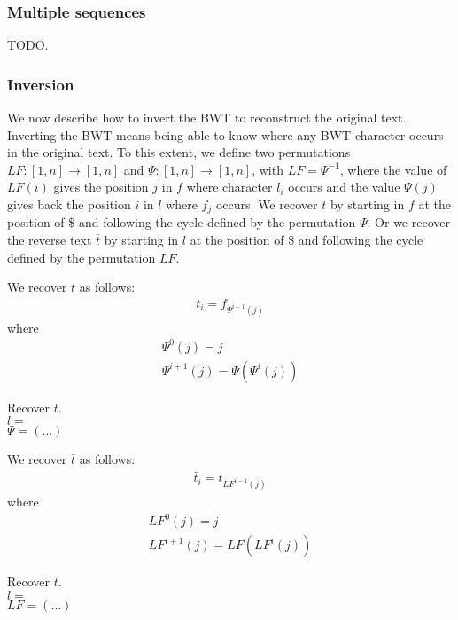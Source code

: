 \subsubsection{Multiple sequences}

TODO.

\subsubsection{Inversion}

We now describe how to invert the BWT to reconstruct the original text.
Inverting the BWT means being able to know where any BWT character occurs in the original text.
To this extent, we define two permutations $LF : [1,n] \rightarrow [1,n]$ and $\Psi : [1,n] \rightarrow [1,n]$, with $LF = \Psi^{-1}$, where the value of $LF(i)$ gives the position $j$ in $f$ where character $l_i$ occurs and the value $\Psi(j)$ gives back the position $i$ in $l$ where $f_j$ occurs.
We recover $t$ by starting in $f$ at the position of \$ and following the cycle defined by the permutation $\Psi$.
Or we recover the reverse text $\bar{t}$ by starting in $l$ at the position of \$ and following the cycle defined by the permutation $LF$.

We recover $t$ as follows:
\begin{eqnarray}
t_i = f_{\Psi^{i-1}(j)}
\end{eqnarray}
where 
\begin{eqnarray}
\Psi^0(j)=j\\
\Psi^{i+1}(j) = \Psi(\Psi^{i}(j))
\end{eqnarray}

\begin{example}
Recover $t$.\\
$l=$\\
$\Psi = (\dots)$
\end{example}

We recover $\bar{t}$ as follows:
\begin{eqnarray}
\bar{t}_i = t_{LF^{i-1}(j)}
\end{eqnarray}
where 
\begin{eqnarray}
LF^0(j)=j\\
LF^{i+1}(j) = LF(LF^{i}(j))
\end{eqnarray}

\begin{example}
Recover $\bar{t}$.\\
$l=$\\
$LF = (\dots)$
\end{example}


